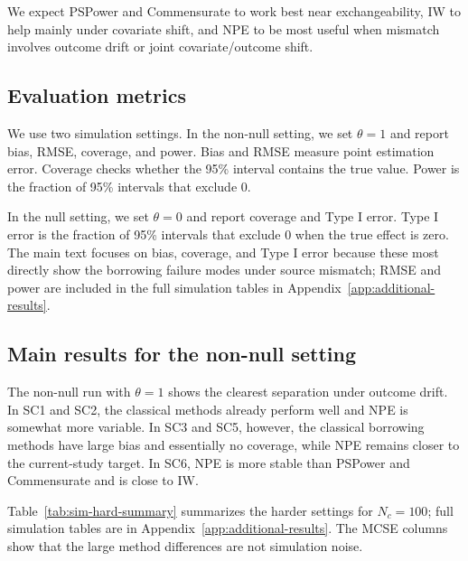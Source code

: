 We expect PSPower and Commensurate to work best near exchangeability, IW to
help mainly under covariate shift, and NPE to be most useful when mismatch
involves outcome drift or joint covariate/outcome shift.

\subsection{Evaluation metrics}

We use two simulation settings.
In the non-null setting, we set $\theta=1$ and report bias, RMSE, coverage,
and power.
Bias and RMSE measure point estimation error.
Coverage checks whether the 95\% interval contains the true value.
Power is the fraction of 95\% intervals that exclude 0.

In the null setting, we set $\theta=0$ and report coverage and Type I error.
Type I error is the fraction of 95\% intervals that exclude 0 when the true
effect is zero.
The main text focuses on bias, coverage, and Type I error because these most
directly show the borrowing failure modes under source mismatch; RMSE and power
are included in the full simulation tables in Appendix~\ref{app:additional-results}.

\subsection{Main results for the non-null setting}

The non-null run with $\theta=1$ shows the clearest separation under outcome
drift. In SC1 and SC2, the classical methods already perform well and NPE is
somewhat more variable. In SC3 and SC5, however, the classical borrowing
methods have large bias and essentially no coverage, while NPE remains closer
to the current-study target. In SC6, NPE is more stable than PSPower and
Commensurate and is close to IW.

Table~\ref{tab:sim-hard-summary} summarizes the harder settings for
$N_c=100$; full simulation tables are in Appendix~\ref{app:additional-results}.
The MCSE columns show that the large method differences are not simulation
noise.

